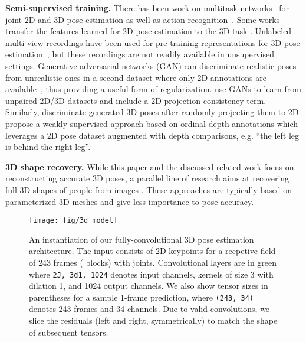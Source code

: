 \documentclass[10pt,twocolumn,letterpaper]{article}
\begin{document}
\noindent\textbf{Semi-supervised training.}
There has been work on multitask networks~\cite{caruana:multitask:1997} for joint 2D and 3D pose estimation \cite{mehta:vnect:2017, luvizon:2d:2018} as well as action recognition~\cite{luvizon:2d:2018}. 
Some works transfer the features learned for 2D pose estimation to the 3D task \cite{mehta:monocular:2017}.
Unlabeled multi-view recordings have been used for pre-training representations for 3D pose estimation~\cite{rhodin:unsupervised:2018}, but these recordings are not readily available in unsupervised settings.
Generative adversarial networks (GAN) can discriminate realistic poses from unrealistic ones in a second dataset where only 2D annotations are available~\cite{yang:3d:2018}, thus providing a useful form of regularization. \cite{tung:adversarial:2017} use GANs to learn from unpaired 2D/3D datasets and include a 2D projection consistency term. Similarly, \cite{drover:2dprojections:2018} discriminate generated 3D poses after randomly projecting them to 2D.
\cite{pavlakos:ordinal:2018} propose a weakly-supervised approach based on ordinal depth annotations which leverages a 2D pose dataset augmented with depth comparisons, e.g. ``the left leg is behind the right leg''. 

\noindent\textbf{3D shape recovery.}
While this paper and the discussed related work focus on reconstructing accurate 3D poses, a parallel line of research aims at recovering full 3D shapes of people from images \cite{bogo:keepitsmpl:2016, kanazawa:shapepose:2018}. These approaches are typically based on parameterized 3D meshes and give less importance to pose accuracy.

\begin{figure*}
	\centering
	\texttt{[image: fig/3d\_model]}
	\caption{An instantiation of our fully-convolutional 3D pose estimation architecture. The input consists of 2D keypoints for a recpetive field of 243 frames ( blocks) with  joints.
	Convolutional layers are in green where \texttt{2J, 3d1, 1024} denotes  input channels, kernels of size 3 with dilation 1, and 1024 output channels. 
	We also show tensor sizes in parentheses for a sample 1-frame prediction, where \texttt{(243, 34)} denotes 243 frames and 34 channels. 
	Due to valid convolutions, we slice the residuals (left and right, symmetrically) to match the shape of subsequent tensors. }
    \label{fig:3d_model}
\end{figure*}
\end{document}

